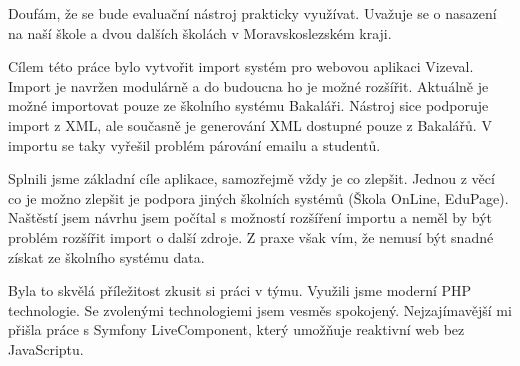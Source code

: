 Doufám, že se bude evaluační nástroj prakticky využívat.
Uvažuje se o nasazení na naší škole a dvou dalších školách v Moravskoslezském kraji.

Cílem této práce bylo vytvořit import systém pro webovou aplikaci Vizeval.
Import je navržen modulárně a do budoucna ho je možné rozšířit.
Aktuálně je možné importovat pouze ze školního systému Bakaláři.
Nástroj sice podporuje import z XML, ale současně je generování XML dostupné pouze z Bakalářů.
V importu se taky vyřešil problém párování emailu a studentů. 

Splnili jsme základní cíle aplikace, samozřejmě vždy je co zlepšit. 
Jednou z věcí co je možno zlepšit je podpora jiných školních systémů (Škola OnLine, EduPage).
Naštěstí jsem návrhu jsem počítal s možností rozšíření importu a neměl by být problém rozšířit import o další zdroje.
Z praxe však vím, že nemusí být snadné získat ze školního systému data.

Byla to skvělá příležitost zkusit si práci v týmu.
Využili jsme moderní PHP technologie. Se zvolenými technologiemi jsem vesměs spokojený.
Nejzajímavější mi přišla práce s Symfony LiveComponent, který umožňuje reaktivní web bez JavaScriptu.
